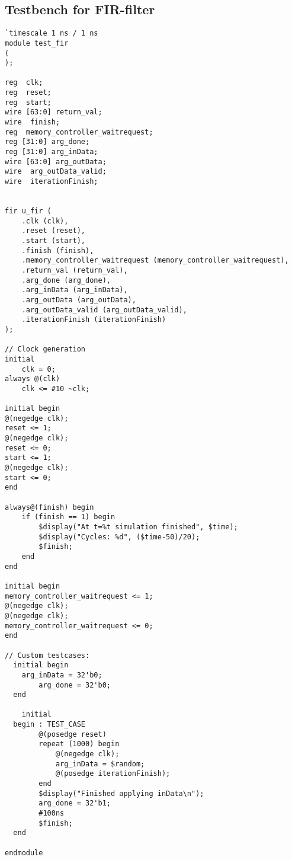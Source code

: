 \subsection{\label{subsec:firfiltertb}Testbench for FIR-filter}
\lstset{language=Verilog,style=VerilogStyle}
\begin{lstlisting}
`timescale 1 ns / 1 ns
module test_fir
(
);

reg  clk;
reg  reset;
reg  start;
wire [63:0] return_val;
wire  finish;
reg  memory_controller_waitrequest;
reg [31:0] arg_done;
reg [31:0] arg_inData;
wire [63:0] arg_outData;
wire  arg_outData_valid;
wire  iterationFinish;


fir u_fir (
	.clk (clk),
	.reset (reset),
	.start (start),
	.finish (finish),
	.memory_controller_waitrequest (memory_controller_waitrequest),
	.return_val (return_val),
	.arg_done (arg_done),
	.arg_inData (arg_inData),
	.arg_outData (arg_outData),
	.arg_outData_valid (arg_outData_valid),
	.iterationFinish (iterationFinish)
);

// Clock generation
initial 
    clk = 0;
always @(clk)
    clk <= #10 ~clk;

initial begin
@(negedge clk);
reset <= 1;
@(negedge clk);
reset <= 0;
start <= 1;
@(negedge clk);
start <= 0;
end

always@(finish) begin
    if (finish == 1) begin
        $display("At t=%t simulation finished", $time);
        $display("Cycles: %d", ($time-50)/20);
        $finish;
    end
end

initial begin
memory_controller_waitrequest <= 1;
@(negedge clk);
@(negedge clk);
memory_controller_waitrequest <= 0;
end

// Custom testcases:     
  initial begin
    arg_inData = 32'b0; 
		arg_done = 32'b0;
  end 
	
	initial  
  begin : TEST_CASE 
		@(posedge reset)
		repeat (1000) begin 
			@(negedge clk); 
			arg_inData = $random; 
			@(posedge iterationFinish); 
		end	
		$display("Finished applying inData\n");
		arg_done = 32'b1;
		#100ns
		$finish;
  end 

endmodule 
\end{lstlisting}